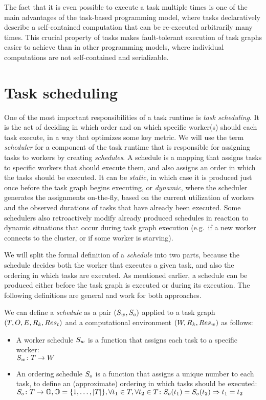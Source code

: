 The fact that it is even possible to execute a task multiple times is one of the main advantages of
the task-based programming model, where tasks declaratively describe a self-contained computation
that can be re-executed arbitrarily many times. This crucial property of tasks makes fault-tolerant
execution of task graphs easier to achieve than in other programming models, where individual
computations are not self-contained and serializable.

\section{Task scheduling}
\label{sec:task-scheduling}
One of the most important responsibilities of a task runtime is \emph{task scheduling}. It is the
act of deciding in which order and on which specific worker(s) should each task execute, in a way
that optimizes some key metric. We will use the term \emph{scheduler} for a component of the
task runtime that is responsible for assigning tasks to workers by creating \emph{schedules}.
A schedule is a mapping that assigns tasks to specific workers that should execute them, and also
assigns an order in which the tasks should be executed. It can be \emph{static}, in which
case it is produced just once before the task graph begins executing, or \emph{dynamic},
where the scheduler generates the assignments on-the-fly, based on the current utilization of
workers and the observed durations of tasks that have already been executed. Some schedulers also
retroactively modify already produced schedules in reaction to dynamic situations that occur during
task graph execution (e.g.\ if a new worker connects to the cluster, or if some worker is
starving).

We will split the formal definition of a \emph{schedule} into two parts, because the
schedule decides both the worker that executes a given task, and also the ordering in which tasks
are executed. As mentioned earlier, a schedule can be produced either before the task graph is
executed or during its execution. The following definitions are general and work for both
approaches.

We can define a \emph{schedule} as a pair $(S_w, S_o)$ applied to a task graph
$(T, O, E, R_k, Res_t)$ and a computational environment $(W, R_k, Res_w)$ as
follows:

\begin{itemize}[itemsep=0pt]
	\item A worker schedule $S_w$ is a function that assigns each task to a specific worker:
	      \\ $S_w\colon T \rightarrow W$
	\item An ordering schedule $S_o$ is a function that assigns a unique number to each
	      task, to define an (approximate) ordering in which tasks should be executed: \\
	      $S_o\colon T \rightarrow \mathbb{O}, \mathbb{O} = \{1,\ldots,|T|\},
		      \forall t_1\in{}T, \forall t_2\in{}T\colon S_o(t_1) = S_o(t_2) \Rightarrow t_1 = t_2$
\end{itemize}

